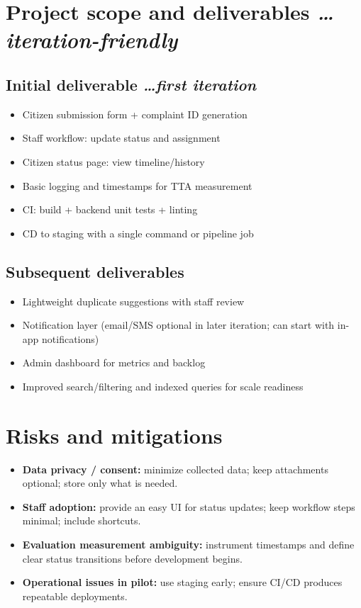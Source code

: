 \documentclass[11pt,a4paper]{article}
\newcommand{\BvrHint}[1]{%
  {\normalfont\normalsize\itshape\hfill #1}}
\begin{document}
\section{Project scope and deliverables %
\BvrHint{\ldots iteration-friendly}}
\subsection{Initial deliverable %
\BvrHint{\ldots first iteration}}
\begin{itemize}[leftmargin=0.7cm]
    \item Citizen submission form + complaint ID generation
    \item Staff workflow: update status and assignment
    \item Citizen status page: view timeline/history
    \item Basic logging and timestamps for TTA measurement
    \item CI: build + backend unit tests + linting
    \item CD to staging with a single command or pipeline job
\end{itemize}

\subsection{Subsequent deliverables}
\begin{itemize}[leftmargin=0.7cm]
    \item Lightweight duplicate suggestions with staff review
    \item Notification layer (email/SMS optional in later iteration; can start with in-app notifications)
    \item Admin dashboard for metrics and backlog
    \item Improved search/filtering and indexed queries for scale readiness
\end{itemize}

\section{Risks and mitigations}
\begin{itemize}[leftmargin=0.7cm]
    \item \textbf{Data privacy / consent:} minimize collected data; keep attachments optional; store only what is needed.
    \item \textbf{Staff adoption:} provide an easy UI for status updates; keep workflow steps minimal; include shortcuts.
    \item \textbf{Evaluation measurement ambiguity:} instrument timestamps and define clear status transitions before development begins.
    \item \textbf{Operational issues in pilot:} use staging early; ensure CI/CD produces repeatable deployments.
\end{itemize}
\end{document}

